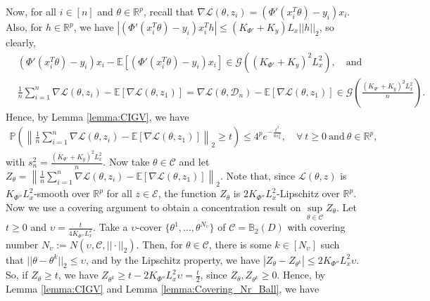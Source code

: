\documentclass{article}
\begin{document}
Now, for all $i \in [n]$ and $\theta \in \mathbb{R}^p$, recall that $\nabla \mathcal{L}(\theta, z_i) = (\Phi'(x_i^T\theta) - y_i)x_i$. Also, for $h \in \mathbb{R}^p$, we have $|(\Phi'(x_i^T\theta) - y_i)x_i^Th| \leq (K_{\Phi'} + K_y)L_x||h||_2$, so clearly,
\begin{align*}
& (\Phi'(x_i^T\theta) - y_i)x_i - \mathbb{E}[(\Phi'(x_i^T\theta) - y_i)x_i] \in \mathcal{G}\left((K_{\Phi'} + K_y)^2L_x^2\right), \quad \text{and} \\
%
& \frac{1}{n}\sum_{i = 1}^n\nabla \mathcal{L}(\theta, z_i) - \mathbb{E}[\nabla \mathcal{L}(\theta, z_1)] = \nabla \mathcal{L}(\theta, \mathcal{D}_n) - \mathbb{E}[\nabla \mathcal{L}(\theta, z_1)] \in \mathcal{G}\left(\frac{(K_{\Phi'} + K_y)^2L_x^2}{n}\right).
\end{align*}
Hence, by Lemma \ref{lemma:CIGV}, we have
\begin{align}
\label{eq:Conc_Grad_GLM_Eq}
\mathbb{P}\left(\left\|\frac{1}{n}\sum_{i = 1}^n\nabla \mathcal{L}(\theta, z_i) - \mathbb{E}[\nabla \mathcal{L}(\theta, z_1)]\right\|_2 \geq t \right) \leq 4^pe^{-\frac{t^2}{8s_n^2}}, \quad \forall \ t \geq 0 \ \mbox{and} \ \theta \in \mathbb{R}^p,
\end{align}
with $s_n^2 = \frac{(K_{\Phi'} + K_y)^2L_x^2}{n}$. Now take $\theta \in \mathcal{C}$ and let $Z_\theta = \left\|\frac{1}{n}\sum_{i = 1}^n\nabla \mathcal{L}(\theta, z_i) - \mathbb{E}[\nabla \mathcal{L}(\theta, z_1)]\right\|_2$. Note that, since $\mathcal{L}(\theta, z)$ is $K_{\Phi''}L_x^2$-smooth over $\mathbb{R}^p$ for all $z \in \mathcal{E}$, the function $Z_\theta$ is $2K_{\Phi''}L_x^2$-Lipschitz over $\mathbb{R}^p$. Now we use a covering argument to obtain a concentration result on $\mathop{\sup}\limits_{\theta \in \mathcal{C}}Z_\theta$. Let $t \geq 0$ and $\upsilon = \frac{t}{4K_{\Phi''}L_x^2}$. Take a $\upsilon$-cover $\{\theta^{1}, \dots, \theta^{N_\upsilon}\}$ of $\mathcal{C} = \mathbb{B}_2(D)$ with covering number $N_\upsilon := N(\upsilon, \mathcal{C}, ||\cdot||_2)$. Then, for $\theta \in \mathcal{C}$, there is some $k \in [N_\upsilon]$ such that $||\theta - \theta^k||_2 \leq \upsilon$, and by the Lipschitz property, we have  $|Z_\theta - Z_{\theta^k}| \leq 2K_{\Phi''}L_x^2\upsilon$. So, if $Z_\theta \geq t$, we have $Z_{\theta^k} \geq t - 2K_{\Phi''}L_x^2\upsilon = \frac{t}{2}$, since $Z_\theta, Z_{\theta^k} \geq 0$. Hence, by Lemma \ref{lemma:CIGV} and Lemma \ref{lemma:Covering_Nr_Ball}, we have
\end{document}
